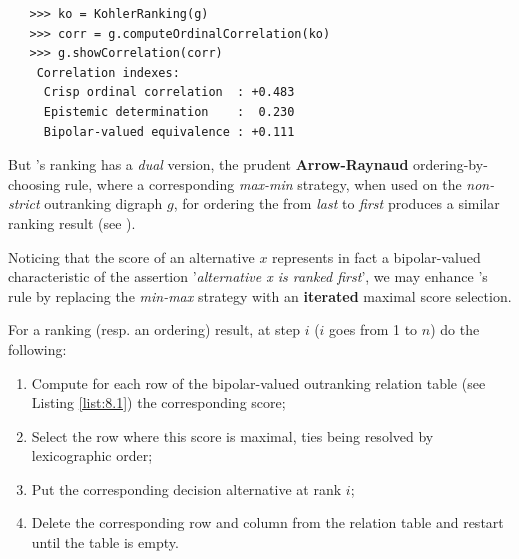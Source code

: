 \begin{lstlisting}
   >>> ko = KohlerRanking(g)  
   >>> corr = g.computeOrdinalCorrelation(ko)
   >>> g.showCorrelation(corr)
    Correlation indexes:
     Crisp ordinal correlation  : +0.483
     Epistemic determination    :  0.230
     Bipolar-valued equivalence : +0.111
\end{lstlisting}

But \Kohler 's ranking has a \emph{dual} version, the prudent \textbf{Arrow-Raynaud} ordering-by-choosing rule, where a corresponding \emph{max-min} strategy, when used on the \emph{non-strict} outranking digraph $g$, for ordering the from \emph{last} to \emph{first} produces a similar ranking result (see \citep{LAM-2009,DIA-2010}).

Noticing that the \NetFlows score of an alternative $x$ represents in fact a bipolar-valued characteristic of the assertion '\emph{alternative x is ranked first}', we may enhance \Kohler 's rule by replacing the \emph{min-max} strategy with an \textbf{iterated} maximal \NetFlows score selection.

For a ranking (resp. an ordering) result, at step $i$ ($i$ goes from 1 to $n$) do the following:
\begin{enumerate}
\item Compute for each row of the bipolar-valued outranking relation table (see Listing \ref{list:8.1}) the corresponding \NetFlows score;
\item Select the row where this score is maximal, ties being resolved by lexicographic order;
\item Put the corresponding decision alternative at rank $i$;
\item Delete the corresponding row and column from the relation table and restart until the table is empty.
\end{enumerate}

